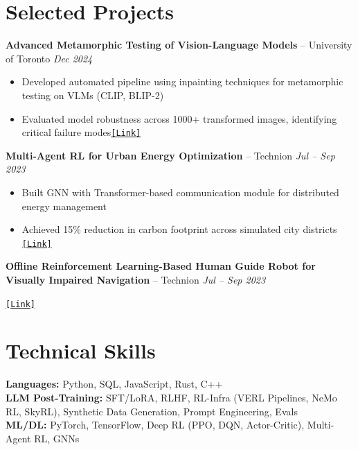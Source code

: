 \documentclass[a4paper,10pt]{article}
\begin{document}
\section{Selected Projects}

\textbf{Advanced Metamorphic Testing of Vision-Language Models} -- University of Toronto \hfill \textit{Dec 2024}
\begin{itemize}
    \item Developed automated pipeline using inpainting techniques for metamorphic testing on VLMs (CLIP, BLIP-2)
    \item Evaluated model robustness across 1000+ transformed images, identifying critical failure modes\href{https://drive.google.com/file/d/1nhbsyuus_rYD7qDcyPvhLffOfqUT33-u/view?usp=sharing}{\texttt{[Link]}}
\end{itemize}

\vspace{4pt}
\textbf{Multi-Agent RL for Urban Energy Optimization} -- Technion \hfill \textit{Jul -- Sep 2023}
\begin{itemize}
    \item Built GNN with Transformer-based communication module for distributed energy management
    \item Achieved 15\% reduction in carbon footprint across simulated city districts \href{https://drive.google.com/file/d/1HLrYvtaLiHNwZq8PY9ZQmY0qOtKT8sr6/view?usp=drive_link}{\texttt{[Link]}}
\end{itemize}


\vspace{4pt}
\textbf{Offline Reinforcement Learning-Based Human Guide Robot for Visually Impaired
Navigation} -- Technion \hfill \textit{Jul -- Sep 2023}
\begin{itemize}
 \href{https://drive.google.com/file/d/1HLrYvtaLiHNwZq8PY9ZQmY0qOtKT8sr6/view?usp=drive_link}{\texttt{[Link]}}
\end{itemize}

\section{Technical Skills}
\textbf{Languages:} Python, SQL, JavaScript, Rust, C++\\
\textbf{LLM Post-Training:} SFT/LoRA, RLHF, RL-Infra (VERL Pipelines, NeMo RL, SkyRL), Synthetic Data Generation, Prompt Engineering, Evals\\
\textbf{ML/DL:} PyTorch, TensorFlow, Deep RL (PPO, DQN, Actor-Critic), Multi-Agent RL, GNNs
\end{document}
